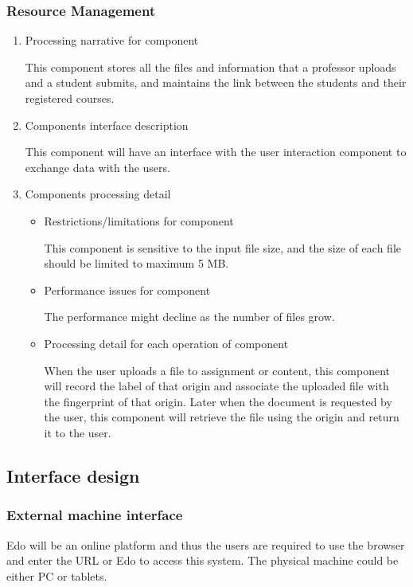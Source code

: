 \documentclass[paper=a4, fontsize=11pt]{scrartcl}
\numberwithin{equation}{section}		%
\numberwithin{figure}{section}			%
\numberwithin{table}{section}				%
\begin{document}
\subsubsection{Resource Management}
\begin{enumerate}
	\item Processing narrative for component
	\par This component stores all the files and information that a professor uploads and a student submits, and maintains the link between the students and their registered courses.
	\item Components interface description
	\par This component will have an interface with the user interaction component to exchange data with the users.
	\item Components processing detail
	\begin{itemize}
		\item Restrictions/limitations for component
		\par This component is sensitive to the input file size, and the size of each file should be limited to maximum 5 MB.
		\item Performance issues for component 
		\par The performance might decline as the number of files grow.
		\item Processing detail for each operation of component 
		\par When the user uploads a file to assignment or content, this component will record the label of that origin and associate the uploaded file with the fingerprint of that origin. Later when the document is requested by the user, this component will retrieve the file using the origin and return it to the user.
	\end{itemize}
\end{enumerate}


\subsection{Interface design}	


\subsubsection{External machine interface}
Edo will be an online platform and thus the users are required to use the browser and enter the URL or Edo to access this system. The physical machine could be either PC or tablets.
\end{document}
